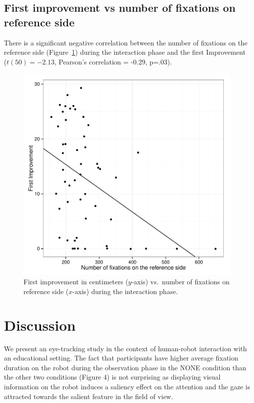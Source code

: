 \documentclass{sig-alternate}
\begin{document}
\subsection{First improvement vs number of fixations on reference side}

There is a significant negative correlation between the number of
fixations on the reference side (Figure~\ref{res4}) during the interaction phase
and the first Improvement ($t(50)=-2.13$, Pearson's correlation = -0.29, p=.03).

\begin{figure}[h!]
    \centering
    \includegraphics[width=0.8\linewidth]{corPlotFirstImprove.pdf}
    \caption{First improvement in centimeters ($y$-axis) vs.~number of fixations
    on reference side ($x$-axis) during the interaction phase.}
    \label{res4}
\end{figure}


\section{Discussion}

We present an eye-tracking study in the context of human-robot
interaction with an educational setting. The fact that participants have
higher average fixation duration on the robot during the observation
phase in the NONE condition than the other two conditions (Figure 4) is
not surprising as displaying visual information on the robot induces a
saliency effect on the attention and the gaze is attracted towards the
salient feature in the field of view.
\end{document}
